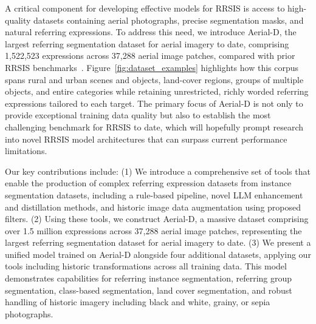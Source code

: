 A critical component for developing effective models for RRSIS is access to high-quality datasets containing aerial photographs, precise segmentation masks, and natural referring expressions. To address this need, we introduce Aerial-D, the largest referring segmentation dataset for aerial imagery to date, comprising 1,522,523 expressions across 37,288 aerial image patches, compared with prior RRSIS benchmarks~\cite{yuan2023rrsis,liu2024rotated,yang2024large}. Figure~\ref{fig:dataset_examples} highlights how this corpus spans rural and urban scenes and objects, land-cover regions, groups of multiple objects, and entire categories while retaining unrestricted, richly worded referring expressions tailored to each target. The primary focus of Aerial-D is not only to provide exceptional training data quality but also to establish the most challenging benchmark for RRSIS to date, which will hopefully prompt research into novel RRSIS model architectures that can surpass current performance limitations.

Our key contributions include: (1) We introduce a comprehensive set of tools that enable the production of complex referring expression datasets from instance segmentation datasets, including a rule-based pipeline, novel LLM enhancement and distillation methods, and historic image data augmentation using proposed filters. (2) Using these tools, we construct Aerial-D, a massive dataset comprising over 1.5 million expressions across 37,288 aerial image patches, representing the largest referring segmentation dataset for aerial imagery to date. (3) We present a unified model trained on Aerial-D alongside four additional datasets, applying our tools including historic transformations across all training data. This model demonstrates capabilities for referring instance segmentation, referring group segmentation, class-based segmentation, land cover segmentation, and robust handling of historic imagery including black and white, grainy, or sepia photographs.
